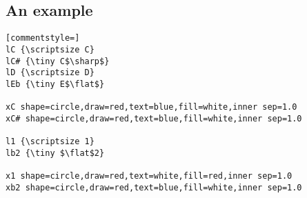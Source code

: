 \documentclass[12pt,letterpaper]{article}
\begin{document}
\subsection{An example}

\begin{lstlisting}[commentstyle=]
lC {\scriptsize C}
lC# {\tiny C$\sharp$}
lD {\scriptsize D}
lEb {\tiny E$\flat$}

xC shape=circle,draw=red,text=blue,fill=white,inner sep=1.0
xC# shape=circle,draw=red,text=blue,fill=white,inner sep=1.0

l1 {\scriptsize 1}
lb2 {\tiny $\flat$2}

x1 shape=circle,draw=red,text=white,fill=red,inner sep=1.0
xb2 shape=circle,draw=red,text=blue,fill=white,inner sep=1.0
\end{lstlisting}
\end{document}
